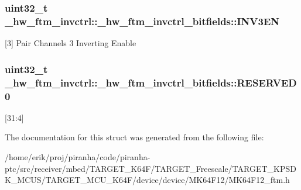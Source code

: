 \subsubsection[{\texorpdfstring{I\+N\+V3\+EN}{INV3EN}}]{\setlength{\rightskip}{0pt plus 5cm}uint32\+\_\+t \+\_\+hw\+\_\+ftm\+\_\+invctrl\+::\+\_\+hw\+\_\+ftm\+\_\+invctrl\+\_\+bitfields\+::\+I\+N\+V3\+EN}\hypertarget{struct__hw__ftm__invctrl_1_1__hw__ftm__invctrl__bitfields_a0dad01f54bda320b2d16ee0c5a04b2b3}{}\label{struct__hw__ftm__invctrl_1_1__hw__ftm__invctrl__bitfields_a0dad01f54bda320b2d16ee0c5a04b2b3}
\mbox{[}3\mbox{]} Pair Channels 3 Inverting Enable 
\subsubsection[{\texorpdfstring{R\+E\+S\+E\+R\+V\+E\+D0}{RESERVED0}}]{\setlength{\rightskip}{0pt plus 5cm}uint32\+\_\+t \+\_\+hw\+\_\+ftm\+\_\+invctrl\+::\+\_\+hw\+\_\+ftm\+\_\+invctrl\+\_\+bitfields\+::\+R\+E\+S\+E\+R\+V\+E\+D0}\hypertarget{struct__hw__ftm__invctrl_1_1__hw__ftm__invctrl__bitfields_abcdc3f4e5ac04d225df498c564f21d34}{}\label{struct__hw__ftm__invctrl_1_1__hw__ftm__invctrl__bitfields_abcdc3f4e5ac04d225df498c564f21d34}
\mbox{[}31\+:4\mbox{]} 

The documentation for this struct was generated from the following file\+:\begin{DoxyCompactItemize}
\item 
/home/erik/proj/piranha/code/piranha-\/ptc/src/receiver/mbed/\+T\+A\+R\+G\+E\+T\+\_\+\+K64\+F/\+T\+A\+R\+G\+E\+T\+\_\+\+Freescale/\+T\+A\+R\+G\+E\+T\+\_\+\+K\+P\+S\+D\+K\+\_\+\+M\+C\+U\+S/\+T\+A\+R\+G\+E\+T\+\_\+\+M\+C\+U\+\_\+\+K64\+F/device/device/\+M\+K64\+F12/M\+K64\+F12\+\_\+ftm.\+h\end{DoxyCompactItemize}
